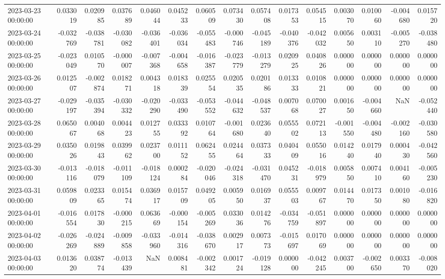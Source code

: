 \begin{tabular}{lrrrrrrrrrrrrrr}
2023-03-23 00:00:00 & 0.033019 & 0.020985 & 0.037689 & 0.046044 & 0.045233 & 0.060509 & 0.073430 & 0.057408 & 0.017353 & 0.054515 & 0.003070 & 0.010060 & -0.004680 & 0.015720 \\
2023-03-24 00:00:00 & -0.032769 & -0.038781 & -0.030082 & -0.036401 & -0.036034 & -0.055483 & -0.000746 & -0.045189 & -0.040376 & -0.042032 & 0.005650 & 0.003110 & -0.005270 & -0.038480 \\
2023-03-25 00:00:00 & -0.023049 & 0.010570 & -0.000007 & -0.007368 & -0.004658 & -0.016387 & -0.023779 & -0.013279 & 0.020925 & 0.040826 & 0.000000 & 0.000000 & 0.000000 & 0.000000 \\
2023-03-26 00:00:00 & 0.012507 & -0.002874 & 0.018271 & 0.004318 & 0.018339 & 0.025554 & 0.020535 & 0.020186 & 0.013333 & 0.010821 & 0.000000 & 0.000000 & 0.000000 & 0.000000 \\
2023-03-27 00:00:00 & -0.029197 & -0.035394 & -0.030332 & -0.020290 & -0.033490 & -0.053552 & -0.044632 & -0.048537 & 0.007068 & 0.070027 & 0.001650 & -0.004660 & NaN & -0.052440 \\
2023-03-28 00:00:00 & 0.065067 & 0.004068 & 0.004423 & 0.012755 & 0.033392 & 0.010764 & -0.001680 & 0.023640 & 0.055502 & 0.072113 & -0.001550 & -0.004480 & -0.002160 & -0.030580 \\
2023-03-29 00:00:00 & 0.035026 & 0.019843 & 0.039962 & 0.023700 & 0.011152 & 0.062455 & 0.024464 & 0.037333 & 0.040409 & 0.055016 & 0.014240 & 0.017940 & 0.000430 & -0.042560 \\
2023-03-30 00:00:00 & -0.013116 & -0.018079 & -0.011109 & -0.018124 & 0.000284 & -0.020046 & -0.024318 & -0.031470 & 0.045231 & -0.018979 & 0.005850 & 0.007410 & 0.004160 & -0.005230 \\
2023-03-31 00:00:00 & 0.059809 & 0.023365 & 0.015474 & 0.036917 & 0.015709 & 0.049205 & 0.005950 & 0.016937 & 0.055503 & 0.009767 & 0.014470 & 0.017350 & 0.001080 & -0.016820 \\
2023-04-01 00:00:00 & -0.016554 & 0.017830 & -0.000215 & 0.063669 & -0.000154 & -0.005269 & 0.033036 & 0.014276 & -0.034759 & -0.051897 & 0.000000 & 0.000000 & 0.000000 & 0.000000 \\
2023-04-02 00:00:00 & -0.026269 & -0.024889 & -0.009858 & -0.033960 & -0.014316 & -0.038670 & 0.002917 & 0.007373 & -0.015697 & 0.017069 & 0.000000 & 0.000000 & 0.000000 & 0.000000 \\
2023-04-03 00:00:00 & 0.013620 & 0.038774 & -0.013439 & NaN & 0.008481 & -0.002342 & 0.001724 & -0.019128 & 0.000000 & -0.042245 & 0.003700 & -0.002650 & 0.003370 & -0.008020 \\

\end{tabular}

